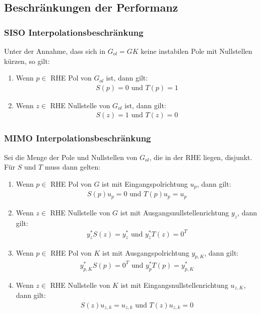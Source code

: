 \documentclass[a4paper,twocolumn,10pt]{article}
\begin{document}
\subsection{Beschränkungen der Performanz}
\subsubsection{SISO Interpolationsbeschränkung}
Unter der Annahme, dass sich in $G_{ol}=GK$ keine instabilen Pole mit Nullstellen kürzen, so gilt:
\begin{enumerate}[label=$\bullet$]
\item Wenn $p\in$ RHE Pol von $G_{ol}$ ist, dann gilt:
\begin{align*}
S(p)=0\text{ und }T(p)=1
\end{align*}
\item Wenn $z\in$ RHE Nullstelle von $G_{ol}$ ist, dann gilt:
\begin{align*}
S(z)=1\text{ und }T(z)=0
\end{align*}
\end{enumerate}

\subsubsection{MIMO Interpolationsbeschränkung}
Sei die Menge der Pole und Nullstellen von $G_{ol}$, die in der RHE liegen, disjunkt. Für $S$ und $T$ muss dann gelten:
\begin{enumerate}[label=$\bullet$]
\item Wenn $p\in$ RHE Pol von $G$ ist mit Eingangspolrichtung $u_p$, dann gilt:
\begin{align*}
S(p)u_p=0\text{ und }T(p)u_p=u_p
\end{align*}
\item Wenn $z\in$ RHE Nullstelle von $G$ ist mit Ausgangsnullstellenrichtung $y_z$, dann gilt:
\begin{align*}
y_z^*S(z)=y_z^*\text{ und }y_z^*T(z)=0^T
\end{align*}
\item Wenn $p\in$ RHE Pol von $K$ ist mit Ausgangspolrichtung $y_{p,K}$, dann gilt:
\begin{align*}
y_{p,K}^*S(p)=0^T\text{ und }y_p^*T(p)=y_{p,K}^*
\end{align*}
\item Wenn $z\in$ RHE Nullstelle von $K$ ist mit Eingangsnullstellenrichtung $u_{z,K}$, dann gilt:
\begin{align*}
S(z)u_{z,k}=u_{z,k}\text{ und }T(z)u_{z,k}=0
\end{align*}
\end{enumerate}
\end{document}
